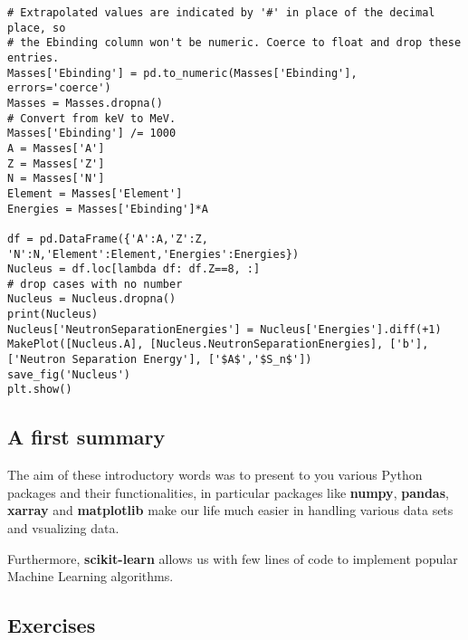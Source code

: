 \documentclass[%
oneside,                 %
final,                   %
10pt]{article}
\begin{document}
\begin{verbatim}
# Extrapolated values are indicated by '#' in place of the decimal place, so
# the Ebinding column won't be numeric. Coerce to float and drop these entries.
Masses['Ebinding'] = pd.to_numeric(Masses['Ebinding'], errors='coerce')
Masses = Masses.dropna()
# Convert from keV to MeV.
Masses['Ebinding'] /= 1000
A = Masses['A']
Z = Masses['Z']
N = Masses['N']
Element = Masses['Element']
Energies = Masses['Ebinding']*A

df = pd.DataFrame({'A':A,'Z':Z, 'N':N,'Element':Element,'Energies':Energies})
Nucleus = df.loc[lambda df: df.Z==8, :]
# drop cases with no number
Nucleus = Nucleus.dropna()
print(Nucleus)
Nucleus['NeutronSeparationEnergies'] = Nucleus['Energies'].diff(+1)
MakePlot([Nucleus.A], [Nucleus.NeutronSeparationEnergies], ['b'], ['Neutron Separation Energy'], ['$A$','$S_n$'])
save_fig('Nucleus')
plt.show()

\end{verbatim}






\subsection*{A first summary}

The aim of these introductory words was to present to you various
Python packages and their functionalities, in particular packages like
\textbf{numpy}, \textbf{pandas}, \textbf{xarray} and \textbf{matplotlib} make our life much easier
in handling various data sets and vsualizing data. 

Furthermore,
\textbf{scikit-learn} allows us with few lines of code to implement popular
Machine Learning algorithms.


\subsection*{Exercises}

\end{document}
